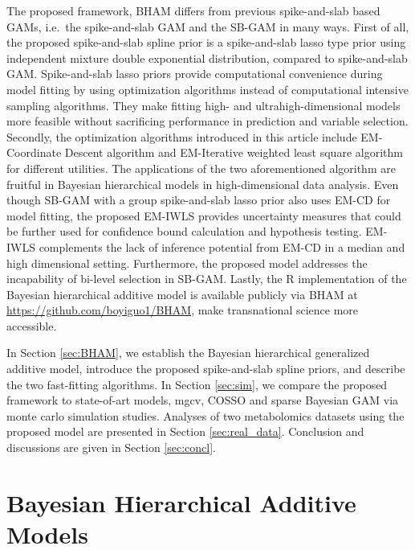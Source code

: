 \documentclass[AMA,STIX1COL,]{WileyNJD-v2}
\begin{document}
The proposed framework, BHAM differs from previous spike-and-slab based
GAMs, i.e.~the spike-and-slab GAM \citep{Scheipl2012} and the SB-GAM
\citep{Bai2021} in many ways. First of all, the proposed spike-and-slab
spline prior is a spike-and-slab lasso type prior using independent
mixture double exponential distribution, compared to spike-and-slab GAM.
Spike-and-slab lasso priors provide computational convenience during
model fitting by using optimization algorithms instead of computational
intensive sampling algorithms. They make fitting high- and
ultrahigh-dimensional models more feasible without sacrificing
performance in prediction and variable selection. Secondly, the
optimization algorithms introduced in this article include EM-Coordinate
Descent algorithm and EM-Iterative weighted least square algorithm for
different utilities. The applications of the two aforementioned
algorithm are fruitful in Bayesian hierarchical models in
high-dimensional data analysis.
\citep{Yi2012, Rockova2014a, Rockova2018} Even though SB-GAM with a
group spike-and-slab lasso prior also uses EM-CD for model fitting, the
proposed EM-IWLS provides uncertainty measures that could be further
used for confidence bound calculation and hypothesis testing. EM-IWLS
complements the lack of inference potential from EM-CD in a median and
high dimensional setting. Furthermore, the proposed model addresses the
incapability of bi-level selection in SB-GAM. Lastly, the R
implementation of the Bayesian hierarchical additive model is available
publicly via BHAM at \url{https://github.com/boyiguo1/BHAM}, make
transnational science more accessible.

In Section \ref{sec:BHAM}, we establish the Bayesian hierarchical
generalized additive model, introduce the proposed spike-and-slab spline
priors, and describe the two fast-fitting algorithms. In Section
\ref{sec:sim}, we compare the proposed framework to state-of-art models,
mgcv, COSSO and sparse Bayesian GAM via monte carlo simulation studies.
Analyses of two metabolomics datasets using the proposed model are
presented in Section \ref{sec:real_data}. Conclusion and discussions are
given in Section \ref{sec:concl}.

\hypertarget{bayesian-hierarchical-additive-models}{%
\section{Bayesian Hierarchical Additive
Models}\label{bayesian-hierarchical-additive-models}}

\label{sec:BHAM}
\end{document}
